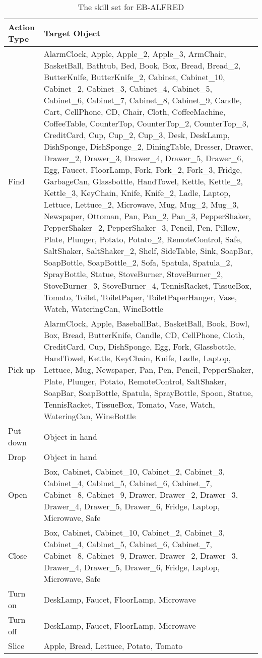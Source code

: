 \begin{table}[h!]
\centering
\begin{tabular}{p{2cm}|p{12cm}}
\toprule
\textbf{Action Type} & \textbf{Target Object} \\
\midrule
{\centering Find} & AlarmClock, Apple, Apple\_2, Apple\_3, ArmChair, BasketBall, Bathtub, Bed, Book, Box, Bread, Bread\_2, ButterKnife, ButterKnife\_2, Cabinet, Cabinet\_10, Cabinet\_2, Cabinet\_3, Cabinet\_4, Cabinet\_5, Cabinet\_6, Cabinet\_7, Cabinet\_8, Cabinet\_9, Candle, Cart, CellPhone, CD, Chair, Cloth, CoffeeMachine, CoffeeTable, CounterTop, CounterTop\_2, CounterTop\_3, CreditCard, Cup, Cup\_2, Cup\_3, Desk, DeskLamp, DishSponge, DishSponge\_2, DiningTable, Dresser, Drawer, Drawer\_2, Drawer\_3, Drawer\_4, Drawer\_5, Drawer\_6, Egg, Faucet, FloorLamp, Fork, Fork\_2, Fork\_3, Fridge, GarbageCan, Glassbottle, HandTowel, Kettle, Kettle\_2, Kettle\_3, KeyChain, Knife, Knife\_2, Ladle, Laptop, Lettuce, Lettuce\_2, Microwave, Mug, Mug\_2, Mug\_3, Newspaper, Ottoman, Pan, Pan\_2, Pan\_3, PepperShaker, PepperShaker\_2, PepperShaker\_3, Pencil, Pen, Pillow, Plate, Plunger, Potato, Potato\_2, RemoteControl, Safe, SaltShaker, SaltShaker\_2, Shelf, SideTable, Sink, SoapBar, SoapBottle, SoapBottle\_2, Sofa, Spatula, Spatula\_2, SprayBottle, Statue, StoveBurner, StoveBurner\_2, StoveBurner\_3, StoveBurner\_4, TennisRacket, TissueBox, Tomato, Toilet, ToiletPaper, ToiletPaperHanger, Vase, Watch, WateringCan, WineBottle \\
\midrule
{\centering Pick up} & AlarmClock, Apple, BaseballBat, BasketBall, Book, Bowl, Box, Bread, ButterKnife, Candle, CD, CellPhone, Cloth, CreditCard, Cup, DishSponge, Egg, Fork, Glassbottle, HandTowel, Kettle, KeyChain, Knife, Ladle, Laptop, Lettuce, Mug, Newspaper, Pan, Pen, Pencil, PepperShaker, Plate, Plunger, Potato, RemoteControl, SaltShaker, SoapBar, SoapBottle, Spatula, SprayBottle, Spoon, Statue, TennisRacket, TissueBox, Tomato, Vase, Watch, WateringCan, WineBottle \\
\midrule
{\centering Put down} & Object in hand \\
\midrule
{\centering Drop} & Object in hand \\
\midrule
{\centering Open} & Box, Cabinet, Cabinet\_10, Cabinet\_2, Cabinet\_3, Cabinet\_4, Cabinet\_5, Cabinet\_6, Cabinet\_7, Cabinet\_8, Cabinet\_9, Drawer, Drawer\_2, Drawer\_3, Drawer\_4, Drawer\_5, Drawer\_6, Fridge, Laptop, Microwave, Safe \\
\midrule
{\centering Close} & Box, Cabinet, Cabinet\_10, Cabinet\_2, Cabinet\_3, Cabinet\_4, Cabinet\_5, Cabinet\_6, Cabinet\_7, Cabinet\_8, Cabinet\_9, Drawer, Drawer\_2, Drawer\_3, Drawer\_4, Drawer\_5, Drawer\_6, Fridge, Laptop, Microwave, Safe \\
\midrule
{\centering Turn on} & DeskLamp, Faucet, FloorLamp, Microwave \\
\midrule
{\centering Turn off} & DeskLamp, Faucet, FloorLamp, Microwave \\
\midrule
{\centering Slice} & Apple, Bread, Lettuce, Potato, Tomato \\
\bottomrule
\end{tabular}
\caption{The skill set for EB-ALFRED}
\label{tab:eb-alfred}
\end{table}


